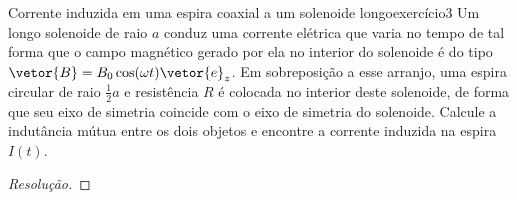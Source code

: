 \begin{exercício}{Corrente induzida em uma espira coaxial a um solenoide longo}{exercício3}
    Um longo solenoide de raio \(a\) conduz uma corrente elétrica que varia no tempo de tal forma que o campo magnético gerado por ela no interior do solenoide é do tipo \(\vetor{B} = B_0 \cos(\omega t) \vetor{e}_z\). Em sobreposição a esse arranjo, uma espira circular de raio \(\frac12a\) e resistência \(R\) é colocada no interior deste solenoide, de forma que seu eixo de simetria coincide com o eixo de simetria do solenoide. Calcule a indutância mútua entre os dois objetos e encontre a corrente induzida na espira \(I(t)\).
\end{exercício}
\begin{proof}[Resolução]

\end{proof}
